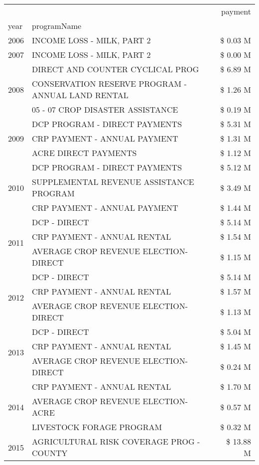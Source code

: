 \begin{tabular}{llr}
\toprule
 &  & payment \\
year & programName &  \\
\midrule
2006 & INCOME LOSS - MILK, PART 2 & \$ 0.03 M \\
\cline{1-3}
2007 & INCOME LOSS - MILK, PART 2 & \$ 0.00 M \\
\cline{1-3}
\multirow[t]{3}{*}{2008} & DIRECT AND COUNTER CYCLICAL PROG & \$ 6.89 M \\
 & CONSERVATION RESERVE PROGRAM - ANNUAL LAND RENTAL & \$ 1.26 M \\
 & 05 - 07 CROP DISASTER ASSISTANCE & \$ 0.19 M \\
\cline{1-3}
\multirow[t]{3}{*}{2009} & DCP PROGRAM - DIRECT PAYMENTS & \$ 5.31 M \\
 & CRP PAYMENT - ANNUAL PAYMENT & \$ 1.31 M \\
 & ACRE DIRECT PAYMENTS & \$ 1.12 M \\
\cline{1-3}
\multirow[t]{3}{*}{2010} & DCP PROGRAM - DIRECT PAYMENTS & \$ 5.12 M \\
 & SUPPLEMENTAL REVENUE ASSISTANCE PROGRAM & \$ 3.49 M \\
 & CRP PAYMENT - ANNUAL PAYMENT & \$ 1.44 M \\
\cline{1-3}
\multirow[t]{3}{*}{2011} & DCP - DIRECT & \$ 5.14 M \\
 & CRP PAYMENT - ANNUAL RENTAL & \$ 1.54 M \\
 & AVERAGE CROP REVENUE ELECTION-DIRECT & \$ 1.15 M \\
\cline{1-3}
\multirow[t]{3}{*}{2012} & DCP - DIRECT & \$ 5.14 M \\
 & CRP PAYMENT - ANNUAL RENTAL & \$ 1.57 M \\
 & AVERAGE CROP REVENUE ELECTION-DIRECT & \$ 1.13 M \\
\cline{1-3}
\multirow[t]{3}{*}{2013} & DCP - DIRECT & \$ 5.04 M \\
 & CRP PAYMENT - ANNUAL RENTAL & \$ 1.45 M \\
 & AVERAGE CROP REVENUE ELECTION-DIRECT & \$ 0.24 M \\
\cline{1-3}
\multirow[t]{3}{*}{2014} & CRP PAYMENT - ANNUAL RENTAL & \$ 1.70 M \\
 & AVERAGE CROP REVENUE ELECTION-ACRE & \$ 0.57 M \\
 & LIVESTOCK FORAGE PROGRAM & \$ 0.32 M \\
\cline{1-3}
\multirow[t]{3}{*}{2015} & AGRICULTURAL RISK COVERAGE PROG - COUNTY & \$ 13.88 M \\

\end{tabular}
